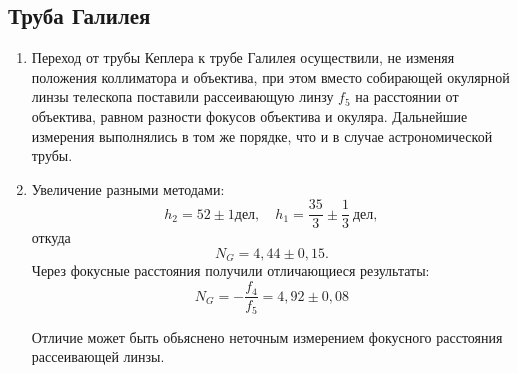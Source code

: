 \documentclass[a4paper, 12pt]{article}%
\begin{document}
	\subsection*{Труба Галилея}
	\begin{enumerate}
	\item Переход от трубы Кеплера к трубе Галилея осуществили, не изменяя положения коллиматора и объектива, при этом вместо собирающей окулярной линзы телескопа поставили рассеивающую линзу $f_5$ на расстоянии от объектива, равном разности фокусов объектива и окуляра. Дальнейшие измерения выполнялись в том же порядке, что и в случае астрономической трубы.
	
	\item Увеличение разными методами:
	\begin{equation*}
		h_2 = 52\pm1\text{дел},\quad h_1 = \dfrac{35}{3} \pm \dfrac{1}{3} \: \text{дел},
	\end{equation*}
	откуда
	\begin{equation*}
	N_G = 4,44\pm 0,15.
	\end{equation*}
	Через фокусные расстояния получили отличающиеся результаты:
	\begin{equation*}
		N_G = -\dfrac{f_4}{f_5} = 4,92 \pm 0,08
	\end{equation*}
	
	Отличие может быть обьяснено неточным измерением фокусного расстояния рассеивающей линзы.
	
	\end{enumerate}
	
\end{document}
